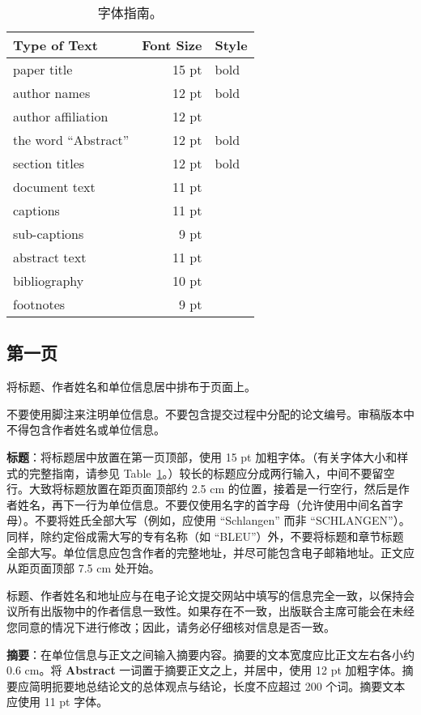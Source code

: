 \documentclass[11pt]{article}
\begin{document}
\begin{table}[h]
\begin{center}
\begin{tabular}{|l|rl|}
\hline \bf Type of Text & \bf Font Size & \bf Style \\ \hline
paper title & 15 pt & bold \\
author names & 12 pt & bold \\
author affiliation & 12 pt & \\
the word ``Abstract'' & 12 pt & bold \\
section titles & 12 pt & bold \\
document text & 11 pt  &\\
captions & 11 pt & \\
sub-captions & 9 pt & \\
abstract text & 11 pt & \\
bibliography & 10 pt & \\
footnotes & 9 pt & \\
\hline
\end{tabular}
\end{center}
\caption{\label{font-table} 字体指南。}
\end{table}
\subsection{第一页}
\label{ssec:first}

将标题、作者姓名和单位信息居中排布于页面上。

不要使用脚注来注明单位信息。不要包含提交过程中分配的论文编号。审稿版本中不得包含作者姓名或单位信息。

{\bf 标题}：将标题居中放置在第一页顶部，使用 15 pt 加粗字体。（有关字体大小和样式的完整指南，请参见 Table~\ref{font-table}。）较长的标题应分成两行输入，中间不要留空行。大致将标题放置在距页面顶部约 2.5 cm 的位置，接着是一行空行，然后是作者姓名，再下一行为单位信息。不要仅使用名字的首字母（允许使用中间名首字母）。不要将姓氏全部大写（例如，应使用 ``Schlangen'' 而非 ``SCHLANGEN''）。同样，除约定俗成需大写的专有名称（如 ``BLEU''）外，不要将标题和章节标题全部大写。单位信息应包含作者的完整地址，并尽可能包含电子邮箱地址。正文应从距页面顶部 7.5 cm 处开始。

标题、作者姓名和地址应与在电子论文提交网站中填写的信息完全一致，以保持会议所有出版物中的作者信息一致性。如果存在不一致，出版联合主席可能会在未经您同意的情况下进行修改；因此，请务必仔细核对信息是否一致。

{\bf 摘要}：在单位信息与正文之间输入摘要内容。摘要的文本宽度应比正文左右各小约 0.6 cm。将 {\bf Abstract} 一词置于摘要正文之上，并居中，使用 12 pt 加粗字体。摘要应简明扼要地总结论文的总体观点与结论，长度不应超过 200 个词。摘要文本应使用 11 pt 字体。
\end{document}
